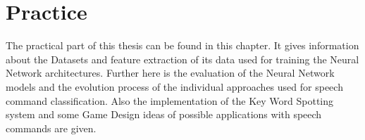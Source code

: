 \chapter{Practice}
The practical part of this thesis can be found in this chapter.
It gives information about the Datasets and feature extraction of its data used for training the Neural Network architectures.
Further here is the evaluation of the Neural Network models and
the evolution process of the individual approaches used for speech command classification.
Also the implementation of the Key Word Spotting system and some Game Design ideas of possible applications with speech commands are given.















